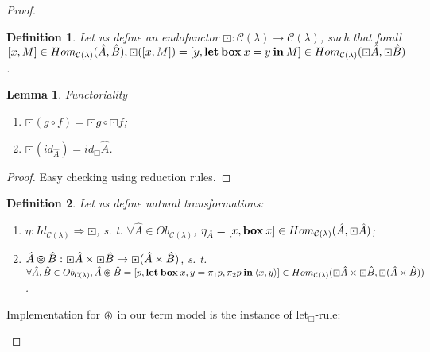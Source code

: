 \documentclass[a4paper]{article}
\newtheorem{lemma}{Lemma}
\newtheorem{defin}{Definition}
\begin{document}
\begin{proof}
\begin{defin}
  Let us define an endofunctor $\boxdot : \mathcal{C}(\lambda) \to \mathcal{C}(\lambda)$, such that
forall $[x,M] \in Hom_{\mathcal{C}(\lambda)}(\hat{A},\hat{B}), \boxdot ([x,M]) = [y, {\bf let \: box \:} x = y {\: \bf in \:} M] \in Hom_{\mathcal{C}(\lambda)}(\boxdot \hat{A}, \boxdot \hat{B})$.

\end{defin}

\begin{lemma} Functoriality

\begin{enumerate}
  \item $\boxdot(g \circ f) = \boxdot g \circ \boxdot f$;
  \item $\boxdot (id_{\hat{A}}) = id_{\boxdot}\hat{A}$.
\end{enumerate}
\end{lemma}

\begin{proof}

Easy checking using reduction rules.

\end{proof}

\begin{defin}

  Let us define natural transformations:

\begin{enumerate}
  \item $\eta: Id_{\mathcal{C}(\lambda)} \Rightarrow \boxdot$, s. t. $\forall \hat{A} \in Ob_{\mathcal{C}(\lambda)}$, $\eta_{\hat{A}} = [x, {\bf box \:} x] \in Hom_{\mathcal{C}(\lambda)}(\hat{A}, \boxdot \hat{A})$;
  \item $\hat{A} \varoast \hat{B} : \boxdot \hat{A} \times \boxdot \hat{B} \to \boxdot (\hat{A} \times \hat{B})$, s. t. $\forall \hat{A}, \hat{B} \in Ob_{\mathcal{C}(\lambda)}, \hat{A} \varoast \hat{B} = [p, {\bf let \: box \:} x,y = \pi_1 p, \pi_2 p {\: \bf in \:} \langle x, y \rangle] \in Hom_{\mathcal{C}(\lambda)}(\boxdot \hat{A} \times \boxdot \hat{B}, \boxdot (\hat{A} \times \hat{B}))$.
\end{enumerate}
\end{defin}

Implementation for $\varoast$ in our term model is the instance of ${\text{let}_{\Box}}$-rule:

\begin{prooftree}
\end{prooftree}


\end{proof}
\end{document}
